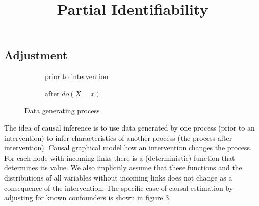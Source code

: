 \documentclass{article}
\title{Partial Identifiability}
\theoremstyle{plain}
\theoremstyle{definition}
\begin{document}
\def\ci{\perp\!\!\!\perp}

\subsection*{Adjustment}

\begin{figure}[H]
    \begin{subfigure}[b]{0.45\textwidth}
	\centering    
        \caption{prior to intervention}
        \label{fig:before}
    \end{subfigure}
    \begin{subfigure}[b]{0.45\textwidth}
    \centering
        \caption{after $do(X=x)$}
        \label{fig:after}
    \end{subfigure}
   
    \caption{Data generating process}\label{fig:causalmodels}
    \label{fig:adjustment}
\end{figure}

The idea of causal inference is to use data generated by one process (prior to an intervention) to infer characteristics of another process (the process after intervention). Causal graphical model how an intervention changes the process. For each node with incoming links there is a (deterministic) function that determines its value. We also implicitly assume that these functions and the distributions of all variables without incoming links does not change as a consequence of the intervention. The specific case of causal estimation by adjusting for known confounders is shown in figure \ref{fig:adjustment}. 
\end{document}
